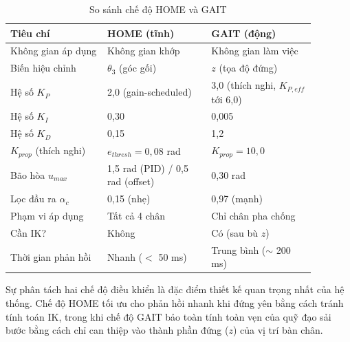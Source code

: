 \begin{table}[H]
\centering
\caption{So sánh chế độ HOME và GAIT}
\label{tab:home_vs_gait}
\renewcommand{\arraystretch}{1.3}
\begin{tabular}{|p{0.28\linewidth}|p{0.30\linewidth}|p{0.30\linewidth}|}
\hline
\textbf{Tiêu chí} & \textbf{HOME (tĩnh)} & \textbf{GAIT (động)} \\ \hline
Không gian áp dụng & Không gian khớp & Không gian làm việc \\ \hline
Biến hiệu chỉnh & $\theta_3$ (góc gối) & $z$ (tọa độ đứng) \\ \hline
Hệ số $K_P$ & 2,0 (gain-scheduled) & 3,0 (thích nghi, $K_{P,eff}$ tới 6,0) \\ \hline
Hệ số $K_I$ & 0,30 & 0,005 \\ \hline
Hệ số $K_D$ & 0,15 & 1,2 \\ \hline
$K_{prop}$ (thích nghi) & $e_{thresh} = 0{,}08$ rad & $K_{prop} = 10{,}0$ \\ \hline
Bão hòa $u_{max}$ & 1,5 rad (PID) / 0,5 rad (offset) & 0,30 rad \\ \hline
Lọc đầu ra $\alpha_c$ & 0,15 (nhẹ) & 0,97 (mạnh) \\ \hline
Phạm vi áp dụng & Tất cả 4 chân & Chỉ chân pha chống \\ \hline
Cần IK? & Không & Có (sau bù $z$) \\ \hline
Thời gian phản hồi & Nhanh ($<$ 50 ms) & Trung bình ($\sim$ 200 ms) \\ \hline
\end{tabular}
\end{table}

Sự phân tách hai chế độ điều khiển là đặc điểm thiết kế quan trọng nhất của hệ thống. Chế độ HOME tối ưu cho phản hồi nhanh khi đứng yên bằng cách tránh tính toán IK, trong khi chế độ GAIT bảo toàn tính toàn vẹn của quỹ đạo sải bước bằng cách chỉ can thiệp vào thành phần đứng ($z$) của vị trí bàn chân.